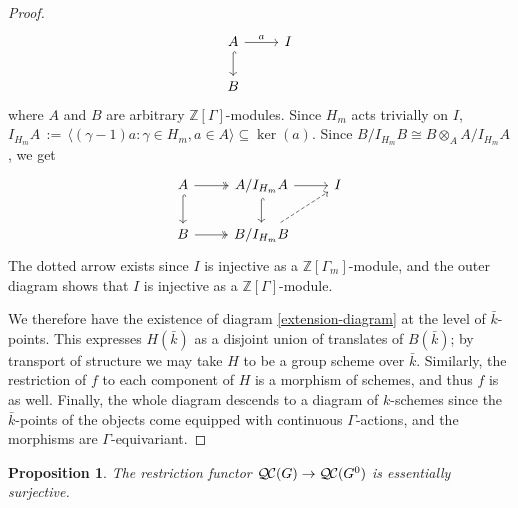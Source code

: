 \documentclass[11pt]{amsart}
\theoremstyle{plain}
\newtheorem{proposition}[theorem]{Proposition}
\theoremstyle{definition}
\theoremstyle{remark}
\newcommand{\ZZ}{{\mathbb{Z}}}
\newcommand{\bFq}{\bar{k}}
\newcommand{\Fq}{k}
\newcommand{\ceq}{{\, :=\, }}
\newcommand{\QC}{{\mathcal{Q\hskip-0.8pt C}}}
\begin{document}
\begin{proof}
  \[
  \begin{tikzcd}
  A \rar{a} \arrow[hook]{d} & I \\
  B
  \end{tikzcd}
  \]
  where $A$ and $B$ are arbitrary $\ZZ[\Gamma]$-modules.  Since $H_m$ acts trivially on $I$,
  $I_{H_m}A \ceq \langle (\gamma-1)a : \gamma \in H_m, a \in A \rangle \subseteq \ker(a).$
  Since $B / I_{H_m}B \cong B \otimes_A A / I_{H_m}A$, we get
  \[
  \begin{tikzcd}
  A \arrow[two heads]{r} \arrow[hook]{d} & A/I_{H_m}A \rar \arrow[hook]{d} & I \\
  B \arrow[two heads]{r} & B/I_{H_m}B \arrow[dashed]{ur} & {}
  \end{tikzcd}
  \]
  The dotted arrow exists since $I$ is injective as a
  $\ZZ[\Gamma_m]$-module, and the outer diagram shows that $I$ is
  injective as a $\ZZ[\Gamma]$-module.

  We therefore have the existence of diagram \eqref{extension-diagram}
  at the level of $\bFq$-points.  This expresses $H(\bFq)$ as a
  disjoint union of translates of $B(\bFq)$; by transport of structure
  we may take $H$ to be a group scheme over $\bFq$.  Similarly, the
  restriction of $f$ to each component of $H$ is a morphism of
  schemes, and thus $f$ is as well.  Finally, the whole diagram
  descends to a diagram of $\Fq$-schemes since the $\bFq$-points of
  the objects come equipped with continuous $\Gamma$-actions, and the
  morphisms are $\Gamma$-equivariant.
\end{proof}

\begin{proposition}\label{prop:restriction}
  The restriction functor $\QC(G)\to \QC(G^0)$ is essentially surjective.
\end{proposition}
\end{document}
